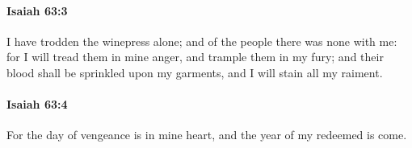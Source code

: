 		\paragraph{Isaiah 63:3} %
			\label{ISAIAH-63-3}

			I have trodden the winepress alone; and of the people there was none with me: for I will tread them in mine anger, and trample them in my fury; and their blood shall be sprinkled upon my garments, and I will stain all my raiment.


		\paragraph{Isaiah 63:4} %
			\label{ISAIAH-63-4}

			For the day of vengeance is in mine heart, and the year of my redeemed is come.


